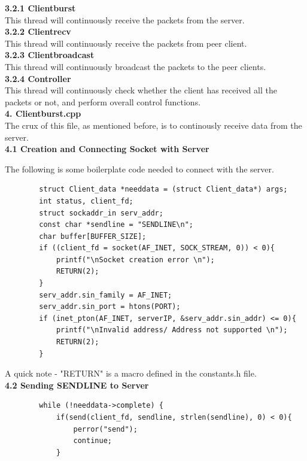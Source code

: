 \documentclass[12pt]{scrartcl}
\begin{document}
\textbf{3.2.1 Clientburst}\\
This thread will continuously receive the packets from the server.\\

\textbf{3.2.2 Clientrecv}\\
This thread will continuously receive the packets from peer client.\\

\textbf{3.2.3 Clientbroadcast}\\
This thread will continuously broadcast the packets to the peer clients.\\

\textbf{3.2.4 Controller}\\
This thread will continuously check whether the client has received all the packets or not, and perform overall control functions.\\

\textbf{4. Clientburst.cpp}\\

The crux of this file, as mentioned before, is to continously receive data from the server. \\

\textbf{4.1 Creation and Connecting Socket with Server}

The following is some boilerplate code needed to connect with the server.

\begin{verbatim}
        struct Client_data *needdata = (struct Client_data*) args;
        int status, client_fd;
        struct sockaddr_in serv_addr;
        const char *sendline = "SENDLINE\n";
        char buffer[BUFFER_SIZE];
        if ((client_fd = socket(AF_INET, SOCK_STREAM, 0)) < 0){
            printf("\nSocket creation error \n");
            RETURN(2);
        }
        serv_addr.sin_family = AF_INET;
        serv_addr.sin_port = htons(PORT);
        if (inet_pton(AF_INET, serverIP, &serv_addr.sin_addr) <= 0){
            printf("\nInvalid address/ Address not supported \n");
            RETURN(2);
        }
\end{verbatim}

A quick note - "RETURN" is a macro defined in the constants.h file. \\

\textbf{4.2 Sending SENDLINE to Server}
\begin{verbatim}
        while (!needdata->complete) {
            if(send(client_fd, sendline, strlen(sendline), 0) < 0){
                perror("send");
                continue;
            }
\end{verbatim}
\end{document}
